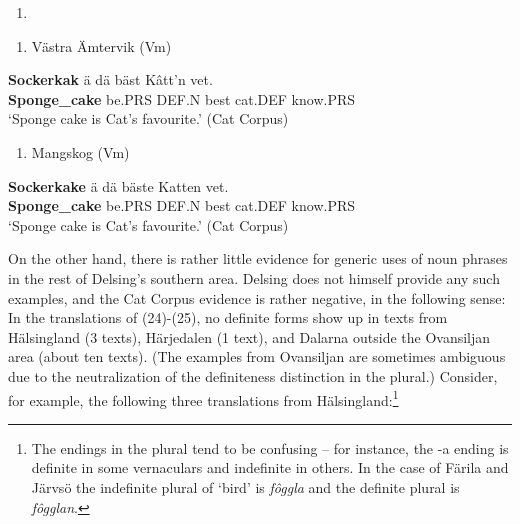 \begin{enumerate} %
\item 
\end{enumerate} %
\setcounter{listLFOxcviiileveli}{0}
\begin{enumerate} %
\item 
Västra Ämtervik (Vm) 

\end{enumerate} %
\ea\label{}
\gll \textbf{Sockerkak} ä  dä  bäst  Kâtt’n  vet.\\


\textbf{Sponge\_cake} be.PRS  DEF.N  best  cat.DEF  know.PRS\\ %


‘Sponge cake is Cat’s favourite.’ (Cat Corpus)
\z


\begin{enumerate} %
\item 
Mangskog (Vm) 

\end{enumerate} %
\ea\label{}
\gll \textbf{Sockerkake} ä  dä  bäste  Katten  vet.\\


\textbf{Sponge\_cake} be.PRS  DEF.N  best  cat.DEF  know.PRS\\ %


‘Sponge cake is Cat’s favourite.’ (Cat Corpus)
\z


On the other hand, there is rather little evidence for generic uses of noun phrases in the rest of Delsing’s southern area. Delsing does not himself provide any such examples, and the Cat Corpus evidence is rather negative, in the following sense: In the translations of (24){}-(25), no definite forms show up in texts from Hälsingland (3 texts), Härjedalen (1 text), and Dalarna outside the Ovansiljan area (about ten texts). (The examples from Ovansiljan are sometimes ambiguous due to the neutralization of the definiteness distinction in the plural.) Consider, for example, the following three translations from Hälsingland:\footnote{ The endings in the plural tend to be confusing – for instance, the -a ending is definite in some vernaculars and indefinite in others. In the case of Färila and Järvsö the indefinite plural of ‘bird’ is \textit{fôggla} and the definite plural is \textit{fôgglan}. }

